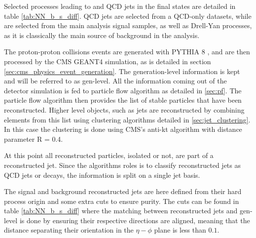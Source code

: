 Selected processes leading to \tauh and QCD jets in the final states are detailed in table \ref{tab:NN_b_s_diff}. QCD jets are selected from a QCD-only datasets, while \tauh are selected from the main analysis signal samples, as well as Drell-Yan processes, as it is classically the main source of background in the analysis.

The proton-proton collisions events are generated with PYTHIA 8 \cite{pythia}, and are then processed by the CMS GEANT4 simulation, as is detailed in section \ref{sec:cms_physics_event_generation}. The generation-level information is kept and will be referred to as gen-level. All the information coming out of the detector simulation is fed to particle flow algorithm as detailed in \ref{sec:pf}.
The particle flow algorithm then provides the list of stable particles that have been reconstructed. Higher level objects, such as jets are reconstructed by combining elements from this list using clustering algorithms detailed in \ref{sec:jet_clustering}. In this case the clustering is done using CMS's anti-kt algorithm with distance parameter R = 0.4. 

At this point all reconstructed particles, isolated or not, are part of a reconstructed jet. Since the algorithms roles is to classify reconstructed jets as QCD jets or \tauh decays, the information is split on a single jet basis.

The signal and background reconstructed jets are here defined from their hard process origin and some extra cuts to ensure purity.
The cuts can be found in table \ref{tab:NN_b_s_diff} where the matching between reconstructed jets and gen-level \tauh is done by ensuring their respective directions are aligned, meaning that the distance separating their orientation in the $\eta-\phi$ plane is less than $0.1$.


